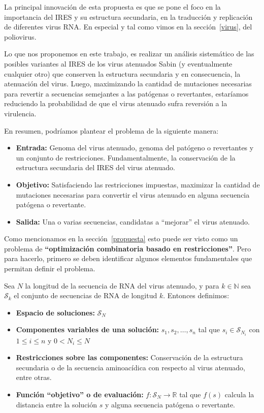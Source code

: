 La principal innovaci\'on de esta propuesta es que se pone el foco en la
importancia del \ac{IRES} y su estructura secundaria, en la traducci\'on y
replicaci\'on de diferentes virus \ac{RNA}. En especial y tal como vimos en la
secci\'on~\ref{virus}, del poliovirus.

Lo que nos proponemos en este trabajo, es realizar un an\'alisis
sistem\'atico de las posibles variantes al \ac{IRES} de los virus atenuados
Sabin (y eventualmente cualquier otro) que conserven la estructura secundaria y
en consecuencia, la atenuaci\'on del virus. Luego, maximizando la cantidad de
mutaciones necesarias para revertir a secuencias semejantes a las pat\'ogenas o
revertantes, estar\'iamos reduciendo la probabilidad de que el virus atenuado
sufra reversi\'on a la virulencia.

En resumen, podr\'iamos plantear el problema de la siguiente manera:
\begin{itemize}
 \item \textbf{Entrada:} Genoma del virus atenuado, genoma del pat\'ogeno o
revertantes y un conjunto de restricciones. Fundamentalmente, la conservaci\'on
de la estructura secundaria del \ac{IRES} del virus atenuado.
 \item \textbf{Objetivo:} Satisfaciendo las restricciones impuestas, maximizar
la cantidad de mutaciones necesarias para convertir el virus atenuado en alguna
secuencia pat\'ogena o revertante.
 \item \textbf{Salida:} Una o varias secuencias, candidatas a ``mejorar'' el
virus atenuado.
\end{itemize}

Como mencionamos en la secci\'on~\ref{propuesta} esto puede ser visto como un
problema de \textbf{``optimizaci\'on combinatoria basado en restricciones''}.
Pero para hacerlo, primero se deben identificar algunos elementos fundamentales
que permitan definir el problema.

Sea $N$ la longitud de la secuencia de \ac{RNA} del virus atenuado, y para $k
\in \mathbb{N}$ sea $\mathcal{S}_{k}$ el conjunto de secuencias de \ac{RNA} de
longitud $k$. Entonces definimos:

\begin{itemize} 
 \item \textbf{Espacio de soluciones:} $\mathcal{S}_{N}$

 \item \textbf{Componentes variables de una soluci\'on:} $s_{1},s_{2}, \dots,
s_{n}$ tal que $s_{i} \in \mathcal{S}_{N_{i}}$ con $1 \le i \le n$ y $0 < N_{i}
\le N$

 \item \textbf{Restricciones sobre las componentes:} Conservaci\'on de la
estructura secundaria o de la secuencia aminoac\'idica con respecto al virus
atenuado, entre otras.

 \item \textbf{Funci\'on ``objetivo'' o de evaluaci\'on:} $f: \mathcal{S}_{N}
\rightarrow \mathbb{R}$ tal que $f(s)$ calcula la distancia entre la soluci\'on
$s$ y alguna secuencia pat\'ogena o revertante.
\end{itemize}

